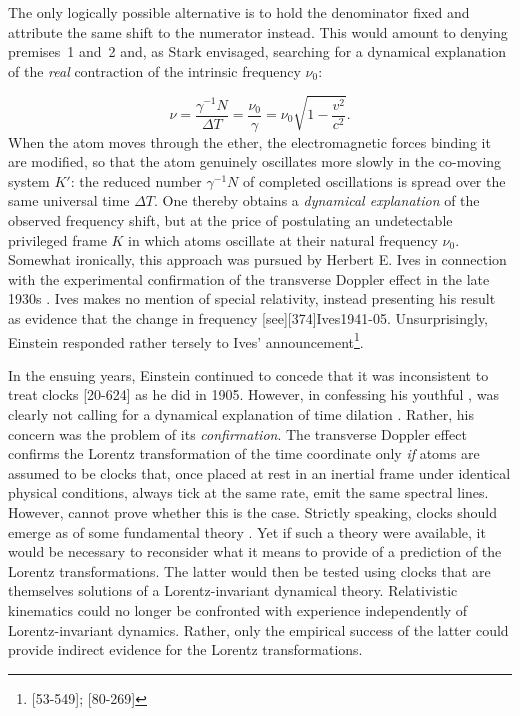 \documentclass[submitted,12pt]{article}
\newcommand{\tDe}{transverse Doppler effect\xspace}
\begin{document}

The only logically possible alternative is to hold the denominator fixed and attribute the same shift to the numerator instead. This would amount to denying premises~1 and~2 and, as Stark envisaged, searching for a dynamical explanation of the \emph{real} contraction of the intrinsic frequency $\nu_0$:

\begin{equation}
\nu = \frac{\gamma^{-1}N}{\Delta T}
= \frac{\nu_0}{\gamma}
= \nu_0 \sqrt{1-\frac{v^2}{c^2}}.
\end{equation}
%
When the atom moves through the ether, the electromagnetic forces binding it are modified, so that the atom genuinely oscillates more slowly in the co-moving system $K'$: the reduced number $\gamma^{-1}N$ of completed oscillations is spread over the same universal time $\Delta T$. One thereby obtains a \emph{dynamical explanation} of the observed frequency shift, but at the price of postulating an undetectable privileged frame $K$ in which atoms oscillate at their natural frequency $\nu_0$. Somewhat ironically, this approach was pursued by Herbert E. Ives \citep{Ives1938} in connection with the experimental confirmation of the \tDe in the late 1930s \citep{Lalli2013}. Ives makes no mention of special relativity, instead presenting his result as evidence that the change in frequency  [see][374]{Ives1941-05}. Unsurprisingly, Einstein responded rather tersely to Ives' announcement\footnote{[53-549]; [80-269]}.

In the ensuing years, Einstein continued to concede that it was inconsistent to treat clocks  [20-624] as he did in 1905. However, in confessing his youthful , \citet[61]{Einstein1949} was clearly not calling for a dynamical explanation of time dilation \ala \citet{Ives1947}. Rather, his concern was the problem of its \emph{confirmation}. The \tDe confirms the Lorentz transformation of the time coordinate only \emph{if} atoms are assumed to be  clocks that, once placed at rest in an inertial frame under identical physical conditions, always tick at the same rate, \ie emit the same spectral lines. However, \sr cannot prove whether this is the case. Strictly speaking, clocks should emerge as  of some fundamental theory \citep[59]{Einstein1949}. Yet if such a theory were available, it would be necessary to reconsider what it means to provide  of a prediction of the Lorentz transformations. The latter would then be tested using clocks that are themselves solutions of a Lorentz-invariant dynamical theory. Relativistic kinematics could no longer be confronted with experience independently of Lorentz-invariant dynamics. Rather, only the empirical success of the latter could provide indirect evidence for the Lorentz transformations.
\end{document}
